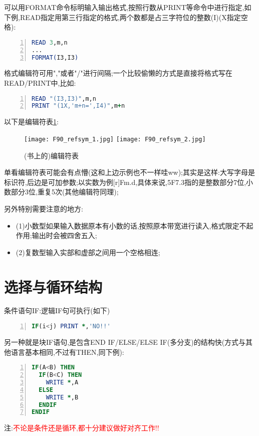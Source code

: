 可以用FORMAT命令标明输入输出格式,按照行数从PRINT等命令中进行指定,如下例,READ指定用第三行指定的格式,两个数都是占三字符位的整数(I)(X指定空格):

\begin{lstlisting}[numbers=left,frame=single,language=Fortran]
READ 3,m,n
...
FORMAT(I3,I3)
\end{lstlisting}
\par
格式编辑符可用","或者"/"进行间隔;一个比较偷懒的方式是直接将格式写在READ/PRINT中,比如:

\begin{lstlisting}[numbers=left,frame=single,language=Fortran]
READ "(I3,I3)",m,n
PRINT "(1X,'m+n=',I4)",m+n
\end{lstlisting}
\par
以下是编辑符表\ref{F90-refsym}:

\begin{figure}[h]
	\noindent
	\centering
	\texttt{[image: F90\_refsym\_1.jpg]}
	\texttt{[image: F90\_refsym\_2.jpg]}
	\caption{(书上的)编辑符表}
	\label{F90-refsym}
\end{figure}

单看编辑符表可能会有点懵(这和上边示例也不一样哇ww);其实是这样:大写字母是标识符,后边是可加参数;以实数为例[r]Fm.d,具体来说,5F7.3指的是整数部分7位,小数部分3位,重复5次(其他编辑符同理);

另外特别需要注意的地方:
\begin{itemize}
\item{(1)小数型如果输入数据原本有小数的话,按照原本带宽进行读入,格式限定不起作用;输出时会被四舍五入;}
\item{(2)复数型输入实部和虚部之间用一个空格相连;}
\end{itemize}

\section{选择与循环结构}
条件语句IF:逻辑IF句可执行(如下)
\begin{lstlisting}[numbers=left,frame=single,language=Fortran]
IF(i<j) PRINT *,'NO!!'
\end{lstlisting}
\par
另一种就是块IF语句,是包含END IF/ELSE/ELSE IF(多分支)的结构快(方式与其他语言基本相同,不过有THEN,同下例):
\begin{lstlisting}[numbers=left,frame=single,language=Fortran]
IF(A<B) THEN
  IF(B<C) THEN
    WRITE *,A
  ELSE
    WRITE *,B
  ENDIF
ENDIF
\end{lstlisting}
\par
注:\textcolor{red}{不论是条件还是循环,都十分建议做好对齐工作!!}

